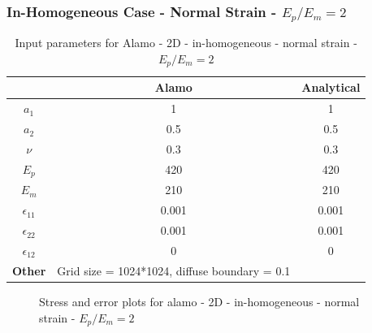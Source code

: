\documentclass[12pt, a4paper]{report}
\begin{document}

\newpage

\subsubsection{In-Homogeneous Case - Normal Strain - $E_p/E_m = 2$}
\begin{table}[H]
    \centering
    \begin{tabular}{|c|c|c|}
        \hline
        & \textbf{Alamo} &\textbf{Analytical}\\
        \hline
        \textbf{$a_1$} & 1 & 1 \\
        \hline
        \textbf{$a_2$} & 0.5 & 0.5 \\
        \hline
        \textbf{$\nu$} & 0.3 & 0.3 \\
        \hline
        \textbf{$E_p$} & 420 & 420 \\
        \hline
        \textbf{$E_m$} & 210 & 210 \\
        \hline
        \textbf{$\epsilon_{11}$} & 0.001 & 0.001 \\
        \hline
        \textbf{$\epsilon_{22}$} & 0.001 & 0.001 \\
        \hline
        \textbf{$\epsilon_{12}$} & 0 & 0 \\
        \hline
        \textbf{Other} & Grid size = 1024*1024, diffuse boundary = 0.1&  \\
        \hline
    \end{tabular}
    \caption{Input parameters for Alamo - 2D - in-homogeneous - normal strain - $E_p/E_m = 2$}
\end{table}

\begin{figure}[htbp]
  \centering
  \hfill
  \caption{Stress and error plots for alamo - 2D - in-homogeneous - normal strain - $E_p/E_m = 2$}
\end{figure}
\end{document}
